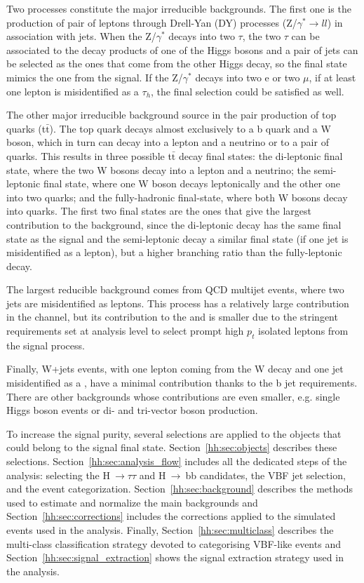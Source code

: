 \documentclass[../main.tex]{subfiles}
\begin{document}
Two processes constitute the major irreducible backgrounds. The first one is the production of pair of leptons through Drell-Yan (DY) processes (Z/$\gamma^*\to ll$) in association with jets. When the Z/$\gamma^*$ decays into two $\tau$, the two $\tau$ can be associated to the decay products of one of the Higgs bosons and a pair of jets can be selected as the ones that come from the other Higgs decay, so the final state mimics the one from the signal. If the Z/$\gamma^*$ decays into two e or two $\mu$, if at least one lepton is misidentified as a $\tau_h$, the final selection could be satisfied as well.

The other major irreducible background source in the pair production of top quarks (t$\bar{\text{t}}$). The top quark decays almost exclusively to a b quark and a W boson, which in turn can decay into a lepton and a neutrino or to a pair of quarks. This results in three possible t$\bar{\text{t}}$ decay final states: the di-leptonic final state, where the two W bosons decay into a lepton and a neutrino; the semi-leptonic final state, where one W boson decays leptonically and the other one into two quarks; and the fully-hadronic final-state, where both W bosons decay into quarks. The first two final states are the ones that give the largest contribution to the background, since the di-leptonic decay has the same final state as the signal and the semi-leptonic decay a similar final state (if one jet is misidentified as a lepton), but a higher branching ratio than the fully-leptonic decay.

The largest reducible background comes from QCD multijet events, where two jets are misidentified as leptons. This process has a relatively large contribution in the \tauh\tauh{} channel, but its contribution to the \taue\tauh{} and \taumu\tauh{} is smaller due to the stringent requirements set at analysis level to select prompt high $p_t$ isolated leptons from the signal process.

Finally, W+jets events, with one lepton coming from the W decay and one jet misidentified as a \tauh{}, have a minimal contribution thanks to the b jet requirements. There are other backgrounds whose contributions are even smaller, e.g. single Higgs boson events or di- and tri-vector boson production.

To increase the signal purity, several selections are applied to the objects that could belong to the signal final state. Section~\ref{hh:sec:objects} describes these selections. Section~\ref{hh:sec:analysis_flow} includes all the dedicated steps of the analysis: selecting the H$~\to\tau\tau$ and H$~\to~$bb candidates, the VBF jet selection, and the event categorization. Section~\ref{hh:sec:background} describes the methods used to estimate and normalize the main backgrounds and Section~\ref{hh:sec:corrections} includes the corrections applied to the simulated events used in the analysis. Finally, Section~\ref{hh:sec:multiclass} describes the multi-class classification strategy devoted to categorising VBF-like events and Section~\ref{hh:sec:signal_extraction} shows the signal extraction strategy used in the analysis.
\end{document}
